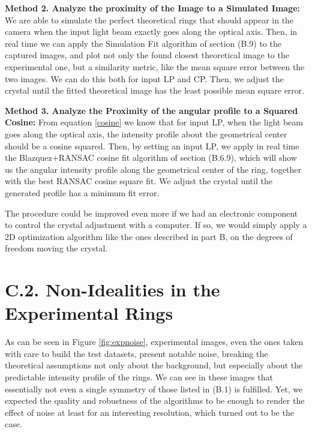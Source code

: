 \documentclass[11pt, a4paper, twoside]{article} %
\begin{document}
{\bf Method 2. Analyze the proximity of the Image to a Simulated Image:} We are able to simulate the perfect theoretical rings that should appear in the camera when the input light beam exactly goes along the optical axis. Then, in real time we can apply the Simulation Fit algorithm of section (B.9) to the captured images, and plot not only the found closest theoretical image to the experimental one, but a similarity metric, like the mean square error between the two images. We can do this both for input LP and CP. Then, we adjust the crystal until the fitted theoretical image has the least possible mean square error.

{\bf Method 3. Analyze the Proximity of the angular profile to a Squared Cosine:} From equation \eqref{cosine} we know that for input LP, when the light beam goes along the optical axis, the intensity profile about the geometrical center should be a cosine squared. Then, by setting an input LP, we apply in real time the Blazquez+RANSAC cosine fit algorithm of section (B.6.9), which will show us the angular intensity profile along the geometrical center of the ring, together with the best RANSAC cosine square fit. We adjust the crystal until the generated profile has a minimum fit error.

The procedure could be improved even more if we had an electronic component to control the crystal adjustment with a computer. If so, we would simply apply a 2D optimization algorithm like the ones described in part B, on the degrees of freedom moving the crystal.
\vspace{-0.2cm}


\section*{C.2. Non-Idealities in the Experimental Rings \vspace{-0.15cm}}
As can be seen in Figure \ref{fig:expnoise}, experimental images, even the ones taken with care to build the test datasets, present notable noise, breaking the theoretical assumptions not only about the background, but especially about the predictable intensity profile of the rings. We can see in these images that essentially not even a single symmetry of those listed in (B.1) is fulfilled. Yet, we expected the quality and robustness of the algorithms to be enough to render the effect of noise at least for an interesting resolution, which turned out to be the case.\vspace{-0.1cm}
\end{document}
